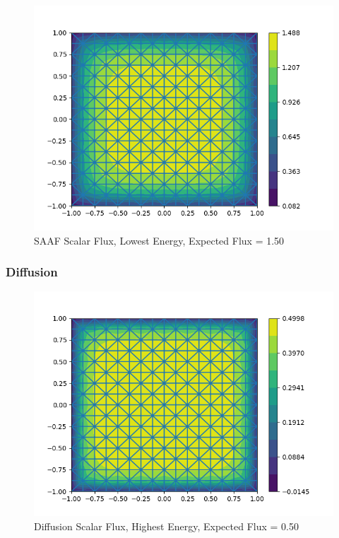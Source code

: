 \begin{figure}[H]
    \centering
    \includegraphics[width=\textwidth]{fig/saaf_multi_group1.png}
    \caption{SAAF Scalar Flux, Lowest Energy, Expected Flux = 1.50}
    \label{fig:SAAF_multi_g2}
\end{figure}

\subsubsection{Diffusion}
\begin{figure}[H]
    \centering
    \includegraphics[width=\textwidth]{fig/diff_multi_group0.png}
    \caption{Diffusion Scalar Flux, Highest Energy, Expected Flux = 0.50}
    \label{fig:diff_multi_g1}
\end{figure}

